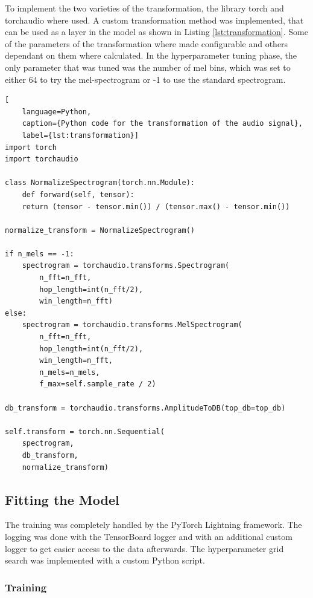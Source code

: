 To implement the two varieties of the transformation, the library torch and torchaudio where used.
A custom transformation method was implemented, that can be used as a layer in the model as shown in 
Listing \ref{lst:transformation}. Some of the parameters of the transformation where made configurable
and others dependant on them where calculated. In the hyperparameter tuning phase, the only parameter
that was tuned was the number of mel bins, which was set to either 64 to try the mel-spectrogram or -1
to use the standard spectrogram.

\begin{lstlisting}[
    language=Python, 
    caption={Python code for the transformation of the audio signal}, 
    label={lst:transformation}]
import torch
import torchaudio

class NormalizeSpectrogram(torch.nn.Module):
    def forward(self, tensor):
    return (tensor - tensor.min()) / (tensor.max() - tensor.min())

normalize_transform = NormalizeSpectrogram()

if n_mels == -1:
    spectrogram = torchaudio.transforms.Spectrogram(
        n_fft=n_fft, 
        hop_length=int(n_fft/2), 
        win_length=n_fft)
else:
    spectrogram = torchaudio.transforms.MelSpectrogram(
        n_fft=n_fft,
        hop_length=int(n_fft/2),
        win_length=n_fft,
        n_mels=n_mels,
        f_max=self.sample_rate / 2)

db_transform = torchaudio.transforms.AmplitudeToDB(top_db=top_db)

self.transform = torch.nn.Sequential(
    spectrogram, 
    db_transform, 
    normalize_transform)
\end{lstlisting}


\subsection{Fitting the Model}%

The training was completely handled by the PyTorch Lightning framework. The logging was done
with the TensorBoard logger and with an additional custom logger to get easier access to the
data afterwards. The hyperparameter grid search was implemented with a custom Python script.

\subsubsection{Training}%

